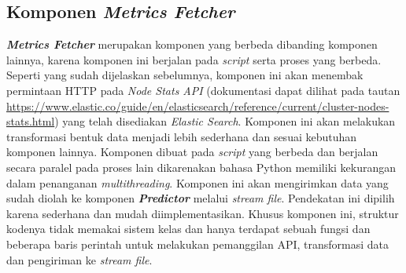 \subsection{Komponen \textit{Metrics Fetcher}}
\textbf{\textit{Metrics Fetcher}} merupakan komponen yang berbeda dibanding komponen lainnya, karena komponen ini berjalan pada \textit{script} serta proses yang berbeda. Seperti yang sudah dijelaskan sebelumnya, komponen ini akan menembak permintaan HTTP pada \textit{Node Stats API} (dokumentasi dapat dilihat pada tautan \url{https://www.elastic.co/guide/en/elasticsearch/reference/current/cluster-nodes-stats.html}) yang telah disediakan \textit{Elastic Search}. Komponen ini akan melakukan transformasi bentuk data menjadi lebih sederhana dan sesuai kebutuhan komponen lainnya. Komponen dibuat pada \textit{script} yang berbeda dan berjalan secara paralel pada proses lain dikarenakan bahasa Python memiliki kekurangan dalam penanganan \textit{multithreading}. Komponen ini akan mengirimkan data yang sudah diolah ke komponen \textbf{\textit{Predictor}} melalui \textit{stream file}. Pendekatan ini dipilih karena sederhana dan mudah diimplementasikan. Khusus komponen ini, struktur kodenya tidak memakai sistem kelas dan hanya terdapat sebuah fungsi dan beberapa baris perintah untuk melakukan pemanggilan API, transformasi data dan pengiriman ke \textit{stream file}.